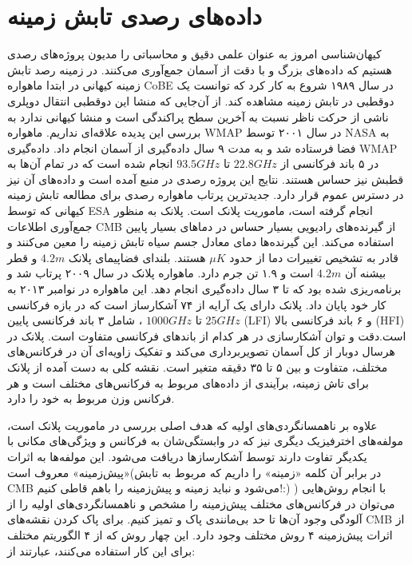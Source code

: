  \section{داده‌های رصدی تابش زمینه } 
کیهان‌شناسی امروز به عنوان علمی دقیق و محاسباتی را مدیون پروژه‌های رصدی هستیم که داده‌های بزرگ و با دقت از آسمان جمع‌آوری می‌کنند. در زمینه رصد تابش زمینه کیهانی در ابتدا ماهواره CoBE در سال ۱۹۸۹ شروع به کار کرد که توانست یک دوقطبی در تابش زمینه مشاهده کند. از آن‌جایی که منشا این دوقطبی انتقال دوپلری ناشی از حرکت ناظر نسبت به آخرین سطح پراکندگی است و منشا کیهانی ندارد به بررسی این پدیده علاقه‌ای نداریم. ماهواره WMAP در سال ۲۰۰۱ توسط NASA  
به فضا فرستاده شد و به مدت ۹ سال داده‌گیری از آسمان انجام داد. داده‌گیری WMAP در ۵ باند فرکانسی از 
$22.8GHz$ 
تا
$93.5GHz$
انجام شده است که در تمام آن‌ها به قطبش نیز حساس هستند. نتایج این پروژه رصدی در منبع 
\cite{hinshaw2013nine}
آمده است و داده‌های آن نیز در دسترس عموم قرار دارد.
جدیدترین پرتاب ماهواره رصدی برای مطالعه تابش زمینه کیهانی که توسط ESA
انجام گرفته است، ماموریت پلانک
است. پلانک به منظور جمع‌آوری اطلاعات CMB از گیرنده‌های رادیویی بسیار حساس در دماهای بسیار پایین استفاده می‌کند. این گیرنده‌ها دمای معادل جسم سیاه تابش زمینه را معین می‌کنند و قادر به تشخیص تغییرات دما از حدود $\mu K$ هستند.
بلندای فضاپیمای پلانک $4.2 m $ و قطر بیشنه آن $4.2 m $ است و ۱.۹ تن جرم دارد. ماهواره پلانک در سال ۲۰۰۹ پرتاب شد و برنامه‌ریزی شده بود که تا ۳ سال داده‌گیری انجام دهد. این ماهواره در نوامبر ۲۰۱۳ به کار خود پایان داد. پلانک دارای یک آرایه از ۷۴ آشکارساز است که در بازه فرکانسی   $25 GHz$ تا  $1000 GHz$ ، شامل ۳ باند فرکانسی پایین (LFI)
و ۶ باند فرکانسی بالا (HFI)
است.دقت و توان آشکارسازی در هر کدام از باندهای فرکانسی متفاوت است. پلانک در هرسال دوبار از کل آسمان تصویربرداری می‌کند و تفکیک زاویه‌ای آن در فرکانس‌های مختلف، متفاوت و بین ۵ تا ۳۵ دقیقه متغیر است.
\cite{akrami2018legacy} 
نقشه کلی به دست آمده از پلانک برای تاش زمینه، برآیندی از داده‌های مربوط به فرکانس‌های مختلف است و هر فرکانس وزن مربوط به خود را دارد. 
\par
علاوه بر ناهمسانگردی‌های اولیه که هدف اصلی بررسی در ماموریت پلانک است، مولفه‌های اخترفیزیک دیگری نیز که در وابستگی‌شان به فرکانس و ویژگی‌های مکانی با یکدیگر تفاوت دارند توسط آشکارساز‌ها دریافت می‌شود. این مولفه‌ها به اثرات‌ «پیش‌زمینه»
 معروف است(در برابر آن کلمه «زمینه» را داریم که مربوط به تابش CMB می‌شود و نباید زمینه و پیش‌زمینه را باهم قاطی کنیم!:) ) با انجام روش‌هایی می‌توان در فرکانس‌های مختلف پیش‌زمینه را مشخص  و ناهمسانگردی‌های اولیه را از آلودگی وجود آن‌ها تا حد بی‌مانندی پاک و تمیز کنیم. برای پاک کردن نقشه‌های CMB از اثرات پیش‌زمینه ۴ روش مختلف وجود دارد.  این چهار روش که از ۴ الگوریتم مختلف برای این کار استفاده می‌کنند، عبارتند از:
